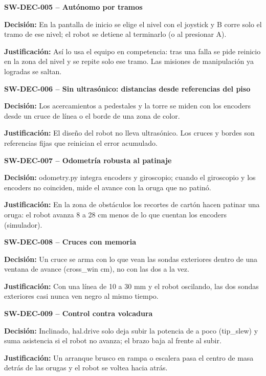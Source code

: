 \medskip\noindent\textbf{SW-DEC-005 -- Autónomo por tramos}\par
\noindent\textbf{Decisi\'on:} En la pantalla de inicio se elige el nivel con el joystick y B corre solo el tramo de ese nivel; el robot se detiene al terminarlo (o al presionar A).\par
\noindent\textbf{Justificaci\'on:} Así lo usa el equipo en competencia: tras una falla se pide reinicio en la zona del nivel y se repite solo ese tramo. Las misiones de manipulación ya logradas se saltan.\par
\medskip\noindent\textbf{SW-DEC-006 -- Sin ultrasónico: distancias desde referencias del piso}\par
\noindent\textbf{Decisi\'on:} Los acercamientos a pedestales y la torre se miden con los encoders desde un cruce de línea o el borde de una zona de color.\par
\noindent\textbf{Justificaci\'on:} El diseño del robot no lleva ultrasónico. Los cruces y bordes son referencias fijas que reinician el error acumulado.\par
\medskip\noindent\textbf{SW-DEC-007 -- Odometría robusta al patinaje}\par
\noindent\textbf{Decisi\'on:} odometry.py integra encoders y giroscopio; cuando el giroscopio y los encoders no coinciden, mide el avance con la oruga que no patinó.\par
\noindent\textbf{Justificaci\'on:} En la zona de obstáculos los recortes de cartón hacen patinar una oruga: el robot avanza 8 a 28 cm menos de lo que cuentan los encoders (simulador).\par
\medskip\noindent\textbf{SW-DEC-008 -- Cruces con memoria}\par
\noindent\textbf{Decisi\'on:} Un cruce se arma con lo que vean las sondas exteriores dentro de una ventana de avance (cross\_win cm), no con las dos a la vez.\par
\noindent\textbf{Justificaci\'on:} Con una línea de 10 a 30 mm y el robot oscilando, las dos sondas exteriores casi nunca ven negro al mismo tiempo.\par
\medskip\noindent\textbf{SW-DEC-009 -- Control contra volcadura}\par
\noindent\textbf{Decisi\'on:} Inclinado, hal.drive solo deja subir la potencia de a poco (tip\_slew) y suma asistencia si el robot no avanza; el brazo baja al frente al subir.\par
\noindent\textbf{Justificaci\'on:} Un arranque brusco en rampa o escalera pasa el centro de masa detrás de las orugas y el robot se voltea hacia atrás.\par
